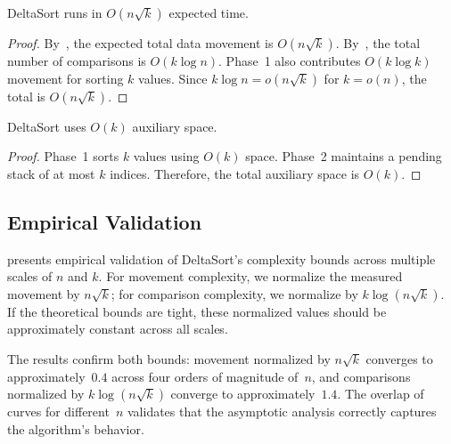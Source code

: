 \begin{theorem}
\label{thm:time-complexity}
DeltaSort runs in $O(n\sqrt{k})$ expected time.
\end{theorem}

\begin{proof}
By~, the expected total data movement is $O(n\sqrt{k})$. By~, the total number of comparisons is $O(k \log n)$. Phase~1 also contributes $O(k \log k)$ movement for sorting $k$ values. Since $k \log n = o(n\sqrt{k})$ for $k = o(n)$, the total is $O(n\sqrt{k})$.
\end{proof}

\begin{theorem}
\label{thm:space}
DeltaSort uses $O(k)$ auxiliary space.
\end{theorem}

\begin{proof}
Phase~1 sorts $k$ values using $O(k)$ space. Phase~2 maintains a pending stack of at most $k$ indices. Therefore, the total auxiliary space is $O(k)$.
\end{proof}

\subsection{Empirical Validation}
\label{sec:empirical-validation}

 presents empirical validation of DeltaSort's complexity bounds across multiple scales of $n$ and $k$. For movement complexity, we normalize the measured movement by $n\sqrt{k}$; for comparison complexity, we normalize by $k\log(n\sqrt{k})$. If the theoretical bounds are tight, these normalized values should be approximately constant across all scales.

The results confirm both bounds: movement normalized by $n\sqrt{k}$ converges to approximately~$0.4$ across four orders of magnitude of~$n$, and comparisons normalized by $k\log(n\sqrt{k})$ converge to approximately~$1.4$. The overlap of curves for different~$n$ validates that the asymptotic analysis correctly captures the algorithm's behavior.

